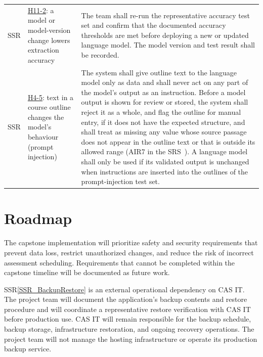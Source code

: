 \documentclass{article}
\newcounter{ssrnum} %
\newcommand{\ssrthessrnum}{SSR\thessrnum}
\newcommand{\ssrref}[1]{SSR\ref{#1}}
\newcommand{\hazref}[1]{\hyperref[haz:#1]{#1}}
\begin{document}
\begin{table}[H]
\begin{tabularx}{\textwidth}{>{\raggedright\arraybackslash}p{}
  >{\raggedright\arraybackslash}p{}
  >{\raggedright\arraybackslash}X}
\leavevmode{}{ssrnum}\ssrthessrnum \label{SSR_ModelChangeTest} & \hazref{H11-2}: a model or model-version change lowers extraction accuracy & The team shall re-run the representative accuracy test set and confirm that the documented accuracy thresholds are met before deploying a new or updated language model. The model version and test result shall be recorded.\\ \addlinespace
\leavevmode{}{ssrnum}\ssrthessrnum \label{SSR_OutputValidation} & \hazref{H4-5}: text in a course outline changes the model's behaviour (prompt injection) & The system shall give outline text to the language model only as data and shall never act on any part of the model's output as an instruction. Before a model output is shown for review or stored, the system shall reject it as a whole, and flag the outline for manual entry, if it does not have the expected structure, and shall treat as missing any value whose source passage does not appear in the outline text or that is outside its allowed range (AIR7 in the SRS~\citep{TeamBVSH2026SRS}). A language model shall only be used if its validated output is unchanged when instructions are inserted into the outlines of the prompt-injection test set.\\
\bottomrule
\end{tabularx}
\end{table}

\section{Roadmap} \label{sec_Roadmap}

The capstone implementation will prioritize safety and security requirements
that prevent data loss, restrict unauthorized changes, and reduce the risk of
incorrect assessment scheduling. Requirements that cannot be completed within
the capstone timeline will be documented as future work.

\ssrref{SSR_BackupRestore} is an external operational dependency on CAS IT.
The project team will document the application's backup contents and restore
procedure and will coordinate a representative restore verification with CAS IT
before production use. CAS IT will remain responsible for the backup schedule,
backup storage, infrastructure restoration, and ongoing recovery operations.
The project team will not manage the hosting infrastructure or operate its
production backup service.
\end{document}
